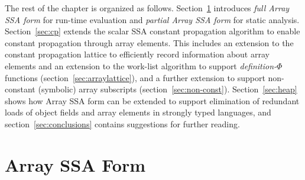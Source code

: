 The rest of the chapter is organized as follows.
Section~\ref{sec:arrayssa} introduces {\em full Array SSA form} for run-time
evaluation and {\em partial Array SSA form}
for static analysis.  
Section~\ref{sec:cp} extends the scalar SSA
constant propagation algorithm to enable
constant propagation through array elements.
This includes an extension to the constant
propagation lattice to efficiently
record information about array
elements and an extension to the
work-list algorithm to support  {\em definition-$\Phi$} functions (section~\ref{sec:arraylattice}), and
a further extension to support non-constant (symbolic) array
subscripts (section~\ref{sec:non-const}). 
Section~\ref{sec:heap} shows how Array SSA form can be extended to
support elimination of redundant loads of 
object fields and array elements in strongly typed languages,
and section~\ref{sec:conclusions} contains suggestions for further reading.

\section{Array SSA Form}
\label{sec:arrayssa}




